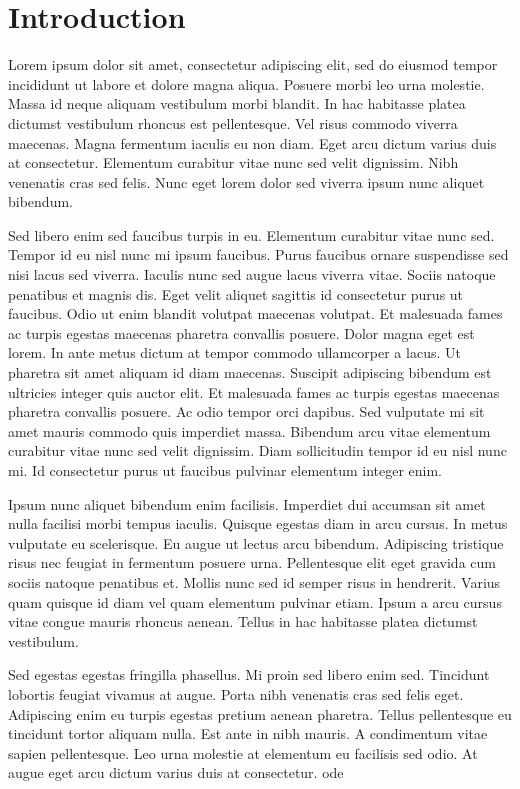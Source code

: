 \section{Introduction}
Lorem ipsum dolor sit amet, consectetur adipiscing elit, sed do eiusmod tempor incididunt ut labore et dolore magna aliqua. Posuere morbi leo urna molestie. Massa id neque aliquam vestibulum morbi blandit. In hac habitasse platea dictumst vestibulum rhoncus est pellentesque. Vel risus commodo viverra maecenas. Magna fermentum iaculis eu non diam. Eget arcu dictum varius duis at consectetur. Elementum curabitur vitae nunc sed velit dignissim. Nibh venenatis cras sed felis. Nunc eget lorem dolor sed viverra ipsum nunc aliquet bibendum.

Sed libero enim sed faucibus turpis in eu. Elementum curabitur vitae nunc sed. Tempor id eu nisl nunc mi ipsum faucibus. Purus faucibus ornare suspendisse sed nisi lacus sed viverra. Iaculis nunc sed augue lacus viverra vitae. Sociis natoque penatibus et magnis dis. Eget velit aliquet sagittis id consectetur purus ut faucibus. Odio ut enim blandit volutpat maecenas volutpat. Et malesuada fames ac turpis egestas maecenas pharetra convallis posuere. Dolor magna eget est lorem. In ante metus dictum at tempor commodo ullamcorper a lacus. Ut pharetra sit amet aliquam id diam maecenas. Suscipit adipiscing bibendum est ultricies integer quis auctor elit. Et malesuada fames ac turpis egestas maecenas pharetra convallis posuere. Ac odio tempor orci dapibus. Sed vulputate mi sit amet mauris commodo quis imperdiet massa. Bibendum arcu vitae elementum curabitur vitae nunc sed velit dignissim. Diam sollicitudin tempor id eu nisl nunc mi. Id consectetur purus ut faucibus pulvinar elementum integer enim.

Ipsum nunc aliquet bibendum enim facilisis. Imperdiet dui accumsan sit amet nulla facilisi morbi tempus iaculis. Quisque egestas diam in arcu cursus. In metus vulputate eu scelerisque. Eu augue ut lectus arcu bibendum. Adipiscing tristique risus nec feugiat in fermentum posuere urna. Pellentesque elit eget gravida cum sociis natoque penatibus et. Mollis nunc sed id semper risus in hendrerit. Varius quam quisque id diam vel quam elementum pulvinar etiam. Ipsum a arcu cursus vitae congue mauris rhoncus aenean. Tellus in hac habitasse platea dictumst vestibulum.

Sed egestas egestas fringilla phasellus. Mi proin sed libero enim sed. Tincidunt lobortis feugiat vivamus at augue. Porta nibh venenatis cras sed felis eget. Adipiscing enim eu turpis egestas pretium aenean pharetra. Tellus pellentesque eu tincidunt tortor aliquam nulla. Est ante in nibh mauris. A condimentum vitae sapien pellentesque. Leo urna molestie at elementum eu facilisis sed odio. At augue eget arcu dictum varius duis at consectetur. \gls{ode}

